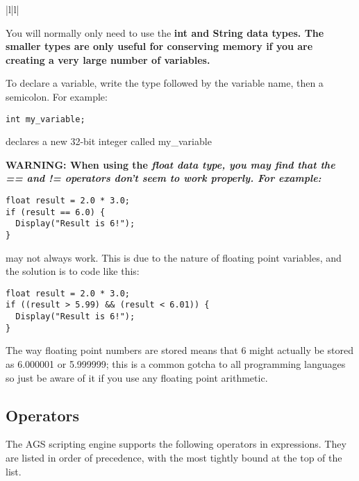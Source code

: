 \begin{tabular}{|l|l|}
\end{tabular}

You will normally only need to use the \bf{int} and \bf{String} data types. The smaller types
are only useful for conserving memory if you are creating a very large number of variables.

To declare a variable, write the type followed by the variable name, then a semicolon.
For example:

\verb$int my_variable;$

declares a new 32-bit integer called  my_variable

\bf{WARNING:} When using the \it{float} data type, you may find that the == and != operators
don't seem to work properly. For example:
\begin{verbatim}
float result = 2.0 * 3.0;
if (result == 6.0) {
  Display("Result is 6!");
}
\end{verbatim}
may not always work. This is due to the nature of floating point variables, and the solution
is to code like this:
\begin{verbatim}
float result = 2.0 * 3.0;
if ((result > 5.99) && (result < 6.01)) {
  Display("Result is 6!");
}
\end{verbatim}
The way floating point numbers are stored means that 6 might actually be stored as 6.000001
or 5.999999; this is a common gotcha to all programming languages so just be aware of it
if you use any floating point arithmetic.


\subsection{Operators}%

The AGS scripting engine supports the following operators in expressions. They are listed
in order of precedence, with the most tightly bound at the top of the list.

